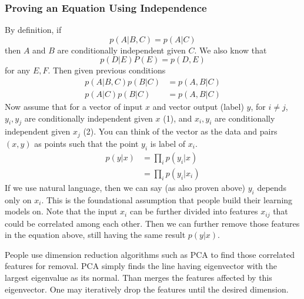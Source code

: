 \documentclass{article}
\numberwithin{equation}{subsection}
\begin{document}
\subsubsection{Proving an Equation Using Independence}
By definition, if
\begin{equation}
    p(A|B,C) = p(A|C)
\end{equation}
then $A$ and $B$ are conditionally independent given $C$. We also know that 
\begin{equation}
    p(D|E)P(E) = p(D,E)
\end{equation}
for any $E, F$. Then given previous conditions
\begin{align}
    p(A|B,C)p(B|C) &= p(A,B|C)\\
    p(A|C)p(B|C) &= p(A,B|C)
\end{align}
Now assume that for a vector of input $x$ and vector output (label) $y$, for $i \neq j$, $y_i, y_j$ are conditionally independent given $x$ (1), and $x_i, y_i$ are conditionally independent given $x_j$ (2). You can think of the vector as the data and pairs $(x,y)$ as points such that the point $y_i$ is label of $x_i$.
\begin{align}
    p(y|x) &= \prod_i p(y_i|x)\\
           &= \prod_i p(y_i|x_i)
\end{align}
If we use natural language, then we can say (as also proven above) $y_i$ depends only on $x_i$. This is the foundational assumption that people build their learning models on. Note that the input $x_i$ can be further divided into features $x_{ij}$ that could be correlated among each other. Then we can further remove those features in the equation above, still having the same result $p(y|x)$. 

People use dimension reduction algorithms such as PCA to find those correlated features for removal. PCA simply finds the line having eigenvector with the largest eigenvalue as its normal. Than merges the features affected by this eigenvector. One may iteratively drop the features until the desired dimension.
\end{document}
